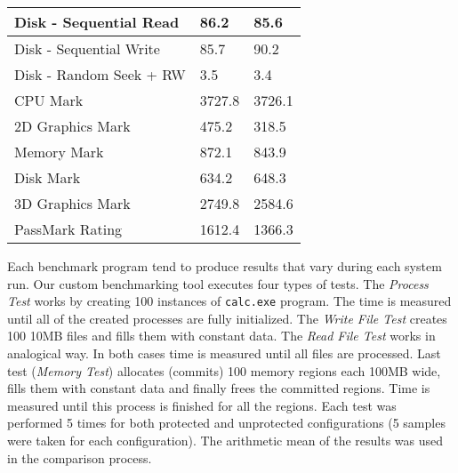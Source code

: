 \documentclass[10pt,twocolumn,a4paper]{article}
\begin{document}
\begin{table}[htbp]
\begin{tabular}{|p{4.4cm}|p{1cm}|p{1.28cm}|}
   \hline
    Disk - Sequential Read & 86.2  & 85.6 \\
   \hline
    Disk - Sequential Write & 85.7  & 90.2 \\
   \hline
    Disk - Random Seek + RW & 3.5   & 3.4 \\
   \hline
    CPU Mark & 3727.8 & 3726.1 \\
   \hline
    2D Graphics Mark & 475.2 & 318.5 \\
   \hline
    Memory Mark & 872.1 & 843.9 \\
   \hline
    Disk Mark & 634.2 & 648.3 \\
   \hline
    3D Graphics Mark & 2749.8 & 2584.6 \\
   \hline
    PassMark Rating & 1612.4 & 1366.3 \\
    \bottomrule
    \end{tabular}\label{tab:passmark}\end{table}

Each benchmark program tend to produce results that vary during each system run. Our custom benchmarking tool executes four types of tests. The {\textit{Process Test}} works by creating 100 instances of {\tt{calc.exe}} program. The time is measured until all of the created processes are fully initialized. The {\textit{Write File Test}} creates 100 10MB files and fills them with constant data. The  {\textit{Read File Test}} works in analogical way. In both cases time is measured until all files are processed. Last test ({\textit{Memory Test}}) allocates (commits) 100 memory regions each 100MB wide, fills them with constant data and finally frees the committed regions. Time is measured until this process is finished for all the regions. Each test was performed 5 times for both protected and unprotected configurations (5 samples were taken for each configuration). The arithmetic mean of the results was used in the comparison process.
\end{document}
